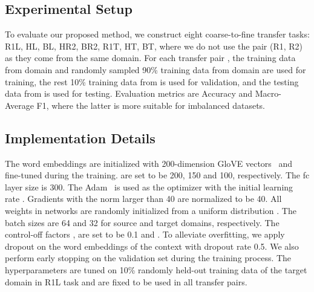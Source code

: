\documentclass[letterpaper]{article} \usepackage{aaai19}  \usepackage{times}  \usepackage{latexsym}
\begin{document}
\subsection{Experimental Setup}
\vspace{-0.5mm}
To evaluate our proposed method, we construct eight coarse-to-fine transfer tasks: R1L, HL, BL, HR2, BR2, R1T, HT, BT,  where we do not use the pair (R1, R2) as they come from the same domain. For each transfer pair , the training data from domain  and randomly sampled 90\% training data from domain  are used for training, the rest 10\% training data from  is used for validation, and the testing data from  is used for testing. Evaluation metrics are Accuracy and Macro-Average F1, where the latter is more suitable for imbalanced datasets.

\vspace{-1mm}
\subsection{Implementation Details}
\vspace{-0.5mm}
The word embeddings are initialized with 200-dimension GloVE vectors~\cite{pennington2014glove} and fine-tuned during the training.  are set to be 200, 150 and 100, respectively. The fc layer size is 300. The Adam~\cite{kingma2014adam} is used as the optimizer with the initial learning rate . Gradients with the  norm larger than 40 are normalized to be 40. All weights in networks are randomly initialized from a uniform distribution . The batch sizes are 64 and 32 for source and target domains, respectively. The control-off factors ,  are set to be 0.1 and . To alleviate overfitting, we apply dropout on the word embeddings of the context with dropout rate 0.5. We also perform early stopping on the validation set during the training process. The hyperparameters are tuned on 10\% randomly held-out training data of the target domain in R1L task and are fixed to be used in all transfer pairs.
\end{document}
